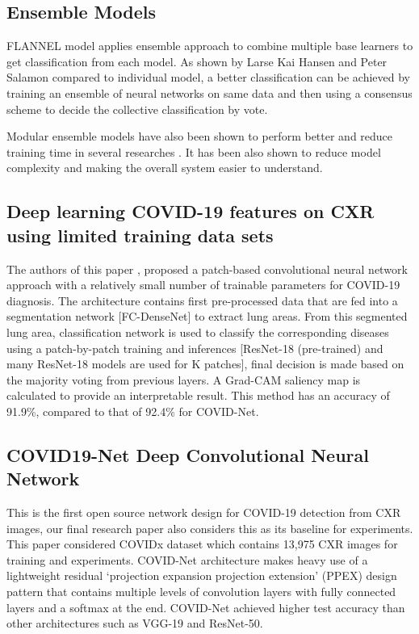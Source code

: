 \documentclass{sigkddExp}
\begin{document}
\subsection{Ensemble Models}

FLANNEL model applies ensemble approach to combine multiple base learners to get
classification from each model. As shown by Larse Kai Hansen and Peter Salamon
\cite{58871} compared to individual model, a better classification can be achieved
by training an ensemble of neural networks on same data and then using a
consensus scheme to decide the collective classification by vote.

Modular ensemble models have also been shown to perform better and reduce
training time in several researches \cite{combine}. It has been also shown to
reduce model complexity and making the overall system easier to understand.

\subsection{Deep learning COVID-19 features on CXR using limited training data sets}

The authors of this paper \cite{pmid32396075}, proposed a patch-based
convolutional neural network approach with a relatively small number of
trainable parameters for COVID-19 diagnosis. The architecture contains first
pre-processed data that are fed into a segmentation network [FC-DenseNet] to
extract lung areas. From this segmented lung area, classification network is
used to classify the corresponding diseases using a patch-by-patch training and
inferences [ResNet-18 (pre-trained) and many ResNet-18 models are used for K
        patches], final decision is made based on the majority voting from previous
layers. A Grad-CAM saliency map is calculated to provide an interpretable
result. This method has an accuracy of 91.9\%, compared to that of 92.4\% for
COVID-Net.

\subsection{COVID19-Net Deep Convolutional Neural Network}

This is the first open source network design for COVID-19 detection from CXR images,
our final research paper also considers this as its baseline for experiments.
This paper considered COVIDx dataset which contains 13,975 CXR images for training and
experiments. COVID-Net architecture makes heavy use of a lightweight residual
‘projection expansion projection extension’ (PPEX) design pattern that contains multiple
levels of convolution layers with fully connected layers and a softmax at the end.
COVID-Net achieved higher test accuracy than other architectures such as VGG-19 and ResNet-50.
\end{document}
